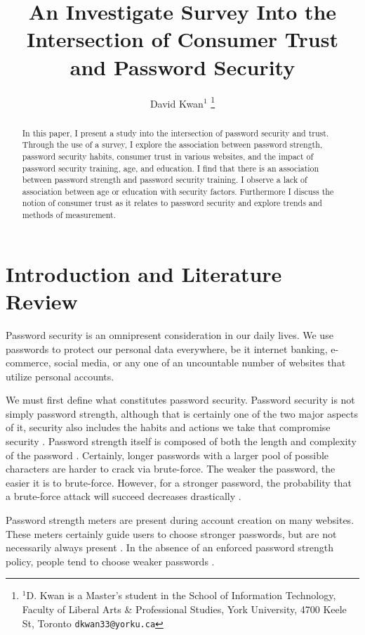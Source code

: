 \documentclass[letterpaper, 10 pt, conference]{ieeeconf}  %
\title{\LARGE \bf
An Investigate Survey Into the Intersection of Consumer Trust and Password Security
}
\author{David Kwan$^{1}$%
\thanks{$^{1}$D. Kwan is a Master's student in the School of Information Technology, Faculty of Liberal Arts \& Professional Studies, York University, 4700 Keele St, Toronto
        {\tt\small dkwan33@yorku.ca}}%
}
\begin{document}
\maketitle
\thispagestyle{empty}
\pagestyle{empty}


\begin{abstract}

In this paper, I present a study into the intersection of password security and trust. Through the use of a survey, I explore the association between password strength, password security habits, consumer trust in various websites, and the impact of password security training, age, and education. I find that there is an association between password strength and password security training. I observe a lack of association between age or education with security factors. Furthermore I discuss the notion of consumer trust as it relates to password security and explore trends and methods of measurement.

\end{abstract}


\section{Introduction and Literature Review}

Password security is an omnipresent consideration in our daily lives. We use passwords to protect our personal data everywhere, be it internet banking, e-commerce, social media, or any one of an uncountable number of websites that utilize personal accounts. 

We must first define what constitutes password security. Password security is not simply password strength, although that is certainly one of the two major aspects of it, security also includes the habits and actions we take that compromise security \cite{Dhamija2000}. Password strength itself is composed of both the length and complexity of the password \cite{Morris1979}. Certainly, longer passwords with a larger pool of possible characters are harder to crack via brute-force. The weaker the password, the easier it is to brute-force. However, for a stronger password, the probability that a brute-force attack will succeed decreases drastically \cite{DellAmico2010}.

Password strength meters are present during account creation on many websites. These meters certainly guide users to choose stronger passwords, but are not necessarily always present \cite{DeCarnavalet2014}. In the absence of an enforced password strength policy, people tend to choose weaker passwords \cite{DellAmico2010}. 
\end{document}
